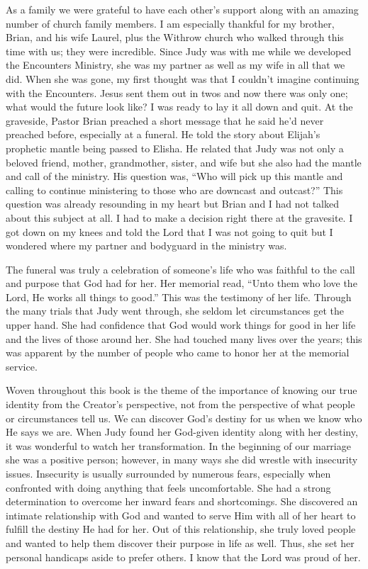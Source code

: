 \documentclass[oneside]{book}
\begin{document}
As a family we were grateful to have each other’s support along with an amazing number of church family members. I am especially thankful for my brother, Brian, and his wife Laurel, plus the Withrow church who walked through this time with us; they were incredible. Since Judy was with me while we developed the Encounters Ministry, she was my partner as well as my wife in all that we did. When she was gone, my first thought was that I couldn’t imagine continuing with the Encounters. Jesus sent them out in twos and now there was only one; what would the future look like? I was ready to lay it all down and quit. At the graveside, Pastor Brian preached a short message that he said he’d never preached before, especially at a funeral. He told the story about Elijah’s prophetic mantle being passed to Elisha. He related that Judy was not only a beloved friend, mother, grandmother, sister, and wife but she also had the mantle and call of the ministry. His question was, “Who will pick up this mantle and calling to continue ministering to those who are downcast and outcast?” This question was already resounding in my heart but Brian and I had not talked about this subject at all. I had to make a decision right there at the gravesite. I got down on my knees and told the Lord that I was not going to quit but I wondered where my partner and bodyguard in the ministry was.

The funeral was truly a celebration of someone’s life who was faithful to the call and purpose that God had for her. Her memorial read, “Unto them who love the Lord, He works all things to good.” This was the testimony of her life. Through the many trials that Judy went through, she seldom let circumstances get the upper hand. She had confidence that God would work things for good in her life and the lives of those around her. She had touched many lives over the years; this was apparent by the number of people who came to honor her at the memorial service. 

Woven throughout this book is the theme of the importance of knowing our true identity from the Creator’s perspective, not from the perspective of what people or circumstances tell us. We can discover God’s destiny for us when we know who He says we are. When Judy found her God-given identity along with her destiny, it was wonderful to watch her transformation. In the beginning of our marriage she was a positive person; however, in many ways she did wrestle with insecurity issues. Insecurity is usually surrounded by numerous fears, especially when confronted with doing anything that feels uncomfortable. She had a strong determination to overcome her inward fears and shortcomings. She discovered an intimate relationship with God and wanted to serve Him with all of her heart to fulfill the destiny He had for her. Out of this relationship, she truly loved people and wanted to help them discover their purpose in life as well. Thus, she set her personal handicaps aside to prefer others. I know that the Lord was proud of her.
\end{document}
